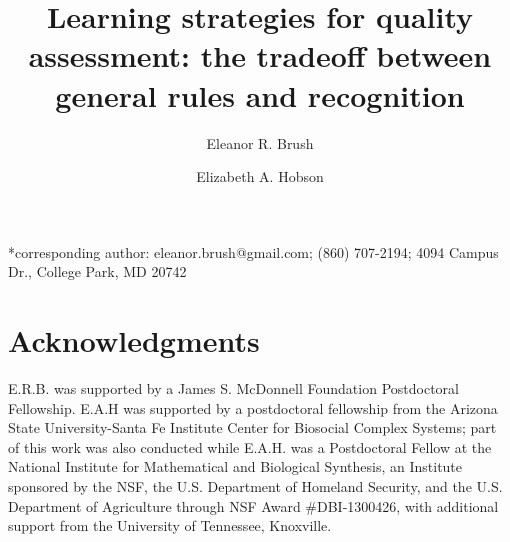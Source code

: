

\noindent
\title{Learning strategies for quality assessment: the tradeoff between general rules and recognition} 

\author[1,*]{Eleanor R. Brush}

\author[2]{Elizabeth A. Hobson}
\date{} 
\maketitle

*corresponding author: eleanor.brush@gmail.com; (860) 707-2194; 4094 Campus Dr., College Park, MD 20742

\newpage


\section*{Acknowledgments}
E.R.B. was supported by a James S. McDonnell Foundation Postdoctoral Fellowship. E.A.H was supported by a postdoctoral fellowship from the Arizona State University-Santa Fe Institute Center for Biosocial Complex Systems; part of this work was also conducted while E.A.H. was a Postdoctoral Fellow at the National Institute for Mathematical and Biological Synthesis, an Institute sponsored by the NSF, the U.S. Department of Homeland Security, and the U.S. Department of Agriculture through NSF Award \#DBI-1300426, with additional support from the University of Tennessee, Knoxville.

